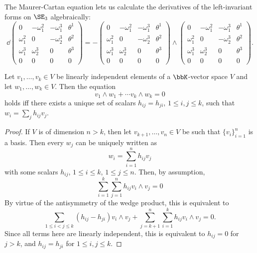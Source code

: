 The Maurer-Cartan equation lets us calculate the derivatives of the left-invariant forms on $\SE_3$ algebraically:
\[\dd \begin{pmatrix}
    0 & -\omega_1^2 & -\omega_1^3& \theta^1\\
    \omega_1^2 & 0 & -\omega_2^3 & \theta^2\\
    \omega_1^3 & \omega_2^3 & 0 & \theta^3\\
    0 & 0& 0& 0
\end{pmatrix}=-\begin{pmatrix}
    0 & -\omega_1^2 & -\omega_1^3& \theta^1\\
    \omega_1^2 & 0 & -\omega_2^3 & \theta^2\\
    \omega_1^3 & \omega_2^3 & 0 & \theta^3\\
    0 & 0& 0& 0
\end{pmatrix}\wedge \begin{pmatrix}
    0 & -\omega_1^2 & -\omega_1^3& \theta^1\\
    \omega_1^2 & 0 & -\omega_2^3 & \theta^2\\
    \omega_1^3 & \omega_2^3 & 0 & \theta^3\\
    0 & 0& 0& 0
\end{pmatrix}.\label{eq structure for surfaces}\]

\begin{lem}[Cartan]\label{lem cartan}
    Let $v_1,\ldots,v_k\in V$ be linearly independent elements of a $\bbK$-vector space $V$ and let $w_1,\ldots,w_k\in V$. Then the equation
    \[v_1\wedge w_1+\cdots v_k\wedge w_k=0\]
    holds iff there exists a unique set of scalars $h_{ij}=h_{ji}$, $1\leq i,j\leq k$, such that $w_i=\sum_j h_{ij}v_j$.
\end{lem}
\begin{proof}
    If $V$ is of dimension $n>k$, then let $v_{k+1},\ldots,v_n\in V$ be such that $\{v_i\}_{i=1}^n$ is a basis. Then every $w_j$ can be uniquely written as 
    \[w_i=\sum_{i=1}^n h_{ij}v_j\]
    with some scalars $h_{ij}$, $1\leq i\leq k$, $1\leq j\leq n$. Then, by assumption,
    \[\sum_{i=1}^k\sum_{j=1}^n h_{ij}v_i\wedge v_j=0\]
    By virtue of the antisymmetry of the wedge product, this is equivalent to
    \[\sum_{1\leq i<j\leq k}(h_{ij}-h_{ji})v_i\wedge v_j+\sum_{j=k+1}^n\sum_{i=1}^k h_{ij}v_i\wedge v_j=0.\]
    Since all terms here are linearly independent, this is equivalent to $h_{ij}=0$ for $j>k$, and $h_{ij}=h_{ji}$ for $1\leq i,j\leq k$.
\end{proof}

